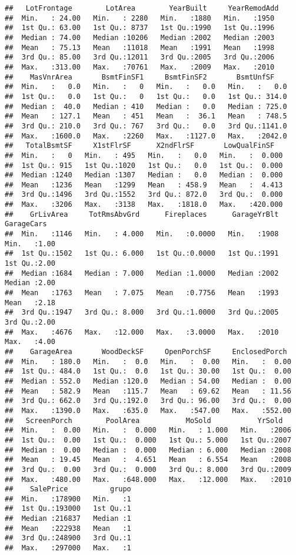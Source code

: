 \documentclass[
]{article}
\begin{document}
\begin{verbatim}
##   LotFrontage        LotArea        YearBuilt     YearRemodAdd 
##  Min.   : 24.00   Min.   : 2280   Min.   :1880   Min.   :1950  
##  1st Qu.: 63.00   1st Qu.: 8737   1st Qu.:1990   1st Qu.:1996  
##  Median : 74.00   Median :10206   Median :2002   Median :2003  
##  Mean   : 75.13   Mean   :11018   Mean   :1991   Mean   :1998  
##  3rd Qu.: 85.00   3rd Qu.:12011   3rd Qu.:2005   3rd Qu.:2006  
##  Max.   :313.00   Max.   :70761   Max.   :2009   Max.   :2010  
##    MasVnrArea       BsmtFinSF1     BsmtFinSF2       BsmtUnfSF     
##  Min.   :   0.0   Min.   :   0   Min.   :   0.0   Min.   :   0.0  
##  1st Qu.:   0.0   1st Qu.:   0   1st Qu.:   0.0   1st Qu.: 314.0  
##  Median :  40.0   Median : 410   Median :   0.0   Median : 725.0  
##  Mean   : 127.1   Mean   : 451   Mean   :  36.1   Mean   : 748.5  
##  3rd Qu.: 210.0   3rd Qu.: 767   3rd Qu.:   0.0   3rd Qu.:1141.0  
##  Max.   :1600.0   Max.   :2260   Max.   :1127.0   Max.   :2042.0  
##   TotalBsmtSF     X1stFlrSF      X2ndFlrSF       LowQualFinSF    
##  Min.   :   0   Min.   : 495   Min.   :   0.0   Min.   :  0.000  
##  1st Qu.: 915   1st Qu.:1020   1st Qu.:   0.0   1st Qu.:  0.000  
##  Median :1240   Median :1307   Median :   0.0   Median :  0.000  
##  Mean   :1236   Mean   :1299   Mean   : 458.9   Mean   :  4.413  
##  3rd Qu.:1496   3rd Qu.:1552   3rd Qu.: 872.0   3rd Qu.:  0.000  
##  Max.   :3206   Max.   :3138   Max.   :1818.0   Max.   :420.000  
##    GrLivArea     TotRmsAbvGrd      Fireplaces      GarageYrBlt     GarageCars  
##  Min.   :1146   Min.   : 4.000   Min.   :0.0000   Min.   :1908   Min.   :1.00  
##  1st Qu.:1502   1st Qu.: 6.000   1st Qu.:0.0000   1st Qu.:1991   1st Qu.:2.00  
##  Median :1684   Median : 7.000   Median :1.0000   Median :2002   Median :2.00  
##  Mean   :1763   Mean   : 7.075   Mean   :0.7756   Mean   :1993   Mean   :2.18  
##  3rd Qu.:1947   3rd Qu.: 8.000   3rd Qu.:1.0000   3rd Qu.:2005   3rd Qu.:2.00  
##  Max.   :4676   Max.   :12.000   Max.   :3.0000   Max.   :2010   Max.   :4.00  
##    GarageArea       WoodDeckSF     OpenPorchSF     EnclosedPorch   
##  Min.   : 180.0   Min.   :  0.0   Min.   :  0.00   Min.   :  0.00  
##  1st Qu.: 484.0   1st Qu.:  0.0   1st Qu.: 30.00   1st Qu.:  0.00  
##  Median : 552.0   Median :120.0   Median : 54.00   Median :  0.00  
##  Mean   : 582.9   Mean   :115.7   Mean   : 69.62   Mean   : 11.56  
##  3rd Qu.: 662.0   3rd Qu.:192.0   3rd Qu.: 96.00   3rd Qu.:  0.00  
##  Max.   :1390.0   Max.   :635.0   Max.   :547.00   Max.   :552.00  
##   ScreenPorch        PoolArea           MoSold           YrSold    
##  Min.   :  0.00   Min.   :  0.000   Min.   : 1.000   Min.   :2006  
##  1st Qu.:  0.00   1st Qu.:  0.000   1st Qu.: 5.000   1st Qu.:2007  
##  Median :  0.00   Median :  0.000   Median : 6.000   Median :2008  
##  Mean   : 19.45   Mean   :  4.651   Mean   : 6.554   Mean   :2008  
##  3rd Qu.:  0.00   3rd Qu.:  0.000   3rd Qu.: 8.000   3rd Qu.:2009  
##  Max.   :480.00   Max.   :648.000   Max.   :12.000   Max.   :2010  
##    SalePrice          grupo  
##  Min.   :178900   Min.   :1  
##  1st Qu.:193000   1st Qu.:1  
##  Median :216837   Median :1  
##  Mean   :222938   Mean   :1  
##  3rd Qu.:248900   3rd Qu.:1  
##  Max.   :297000   Max.   :1
\end{verbatim}
\end{document}
